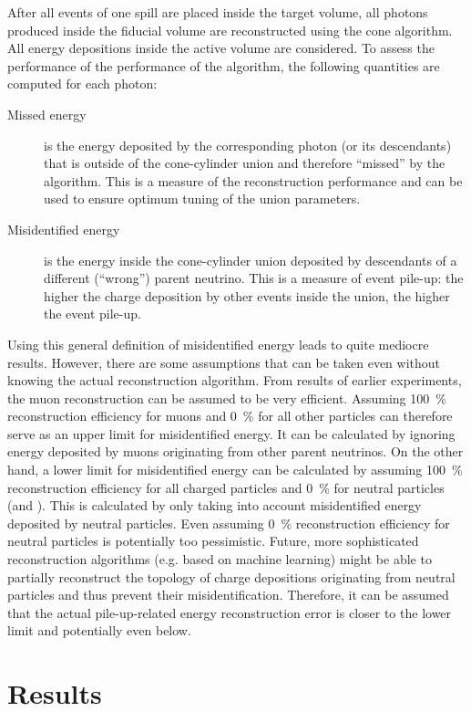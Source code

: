 After all events of one spill are placed inside the target volume, all \Pgpz photons produced inside the fiducial volume are reconstructed using the cone algorithm.
All energy depositions inside the active volume are considered.
To assess the performance of the performance of the algorithm, the following quantities are computed for each photon:
\begin{description}
	\item[Missed energy] is the energy deposited by the corresponding \Pgpz photon (or its descendants) that is outside of the cone-cylinder union and therefore ``missed'' by the algorithm.
		This is a measure of the reconstruction performance and can be used to ensure optimum tuning of the union parameters.
	\item[Misidentified energy] is the energy inside the cone-cylinder union deposited by descendants of a different (``wrong'') parent neutrino.
		This is a measure of event pile-up: the higher the charge deposition by other events inside the union, the higher the event pile-up.
\end{description}
Using this general definition of misidentified energy leads to quite mediocre results.
However, there are some assumptions that can be taken even without knowing the actual reconstruction algorithm.
From results of earlier experiments, the muon reconstruction can be assumed to be very efficient.
Assuming \SI{100}{\percent} reconstruction efficiency for muons and \SI{0}{\percent} for all other particles can therefore serve as an upper limit for misidentified energy.
It can be calculated by ignoring energy deposited by muons originating from other parent neutrinos.
On the other hand, a lower limit for misidentified energy can be calculated by assuming \SI{100}{\percent} reconstruction efficiency for all charged particles and \SI{0}{\percent} for neutral particles (\Pgpz and \Pgg).
This is calculated by only taking into account misidentified energy deposited by neutral particles.
Even assuming \SI{0}{\percent} reconstruction efficiency for neutral particles is potentially too pessimistic.
Future, more sophisticated reconstruction algorithms (e.g. based on machine learning) might be able to partially reconstruct the topology of charge depositions originating from neutral particles and thus prevent their misidentification.
Therefore, it can be assumed that the actual pile-up-related energy reconstruction error is closer to the lower limit and potentially even below.

\section{Results}
\label{sec:dune-nd_results}

